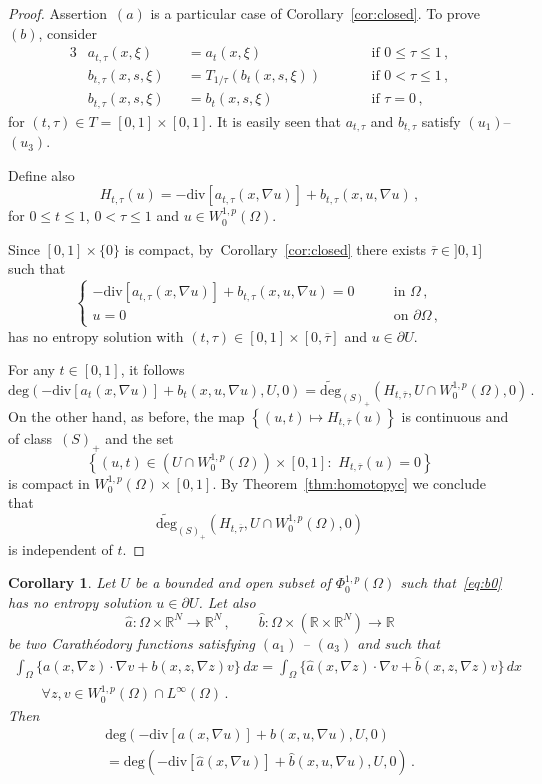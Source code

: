 \documentclass[twoside,reqno]{amsart}
\numberwithin{equation}{section}
\newtheorem{cor}[thm]{Corollary}
\theoremstyle{definition}
\newcommand{\R}{\mathbb{R}}
\begin{document}
%
\begin{proof}
Assertion~$(a)$ is a particular case of
Corollary~\ref{cor:closed}.
To prove~$(b)$, consider
\begin{alignat*}{3}
& a_{t,\tau}(x,\xi) &&= a_t(x,\xi)
&&\qquad\text{if $0\leq \tau\leq 1$}\,,\\
& b_{t,\tau}(x,s,\xi) &&= 
T_{1/\tau}\left(b_t(x,s,\xi)\right)
&&\qquad\text{if $0<\tau\leq 1$}\,,\\
& b_{t,\tau}(x,s,\xi) &&=
b_t(x,s,\xi)
&&\qquad\text{if $\tau=0$}\,,
\end{alignat*}
for $(t,\tau)\in T=[0,1]\times[0,1]$.
It is easily seen that $a_{t,\tau}$ and $b_{t,\tau}$
satisfy $(u_1)$--$(u_3)$.
\par
Define also
\[
H_{t,\tau}(u) =
- \mathrm{div}[a_{t,\tau}(x,\nabla u)] 
+ b_{t,\tau}(x,u,\nabla u)\,,
\]
for $0\leq t\leq 1$, $0<\tau\leq 1$ and $u\in W^{1,p}_0(\Omega)$.
\par
Since $[0,1]\times\{0\}$ is compact, by~Corollary~\ref{cor:closed}
there exists $\overline{\tau}\in]0,1]$ such that 
\[
\begin{cases}
- \mathrm{div}[a_{t,\tau}(x,\nabla u)] 
+ b_{t,\tau}(x,u,\nabla u)=0 
&\qquad\text{in $\Omega$}\,,\\
u=0
&\qquad\text{on $\partial\Omega$}\,,
\end{cases}
\]
has no entropy solution with 
$(t,\tau)\in[0,1]\times[0,\overline{\tau}]$ and $u\in\partial U$.
\par
For any $t\in [0,1]$, it follows
\[
\mathrm{deg}(- \mathrm{div}[a_t(x,\nabla u)] 
+ b_t(x,u,\nabla u),U,0) =
\widetilde{\mathrm{deg}}_{(S)_+}(H_{t,\overline{\tau}},
U\cap W^{1,p}_0(\Omega),0)\,.
\]
On the other hand, as before, the map 
$\left\{(u,t)\mapsto H_{t,\overline{\tau}}(u)\right\}$
is continuous and of class~$(S)_+$ and the set
\[
\left\{(u,t)\in (U\cap W^{1,p}_0(\Omega))\times
[0,1]:\,\,H_{t,\overline{\tau}}(u)=0\right\}
\]
is compact in $W^{1,p}_0(\Omega)\times[0,1]$.
By Theorem~\ref{thm:homotopyc}
we conclude that 
\[
\widetilde{\mathrm{deg}}_{(S)_+}(H_{t,\overline{\tau}},
U\cap W^{1,p}_0(\Omega),0)
\]
is independent of $t$.
\end{proof}
%
\begin{cor}
\label{cor:dec}
Let $U$ be a bounded and open subset of $\Phi^{1,p}_0(\Omega)$
such that~\eqref{eq:b0} has no entropy solution  
$u\in\partial U$.
Let also
\[
\hat{a}:\Omega\times\R^N\rightarrow\R^N\,,\qquad
\hat{b}:\Omega\times(\R\times\R^N)\rightarrow\R
\]
be two Carath\'eodory functions satisfying $(a_1)$ -- $(a_3)$
and such that
\begin{multline*}
\int_{\Omega} \{a(x,\nabla z)\cdot\nabla v + b(x,z,\nabla z)v\}\,dx
= \int_{\Omega} \{\hat{a}(x,\nabla z)\cdot\nabla v 
+ \hat{b}(x,z,\nabla z)v\}\,dx \\
\qquad \forall z, v\in W^{1,p}_0(\Omega)\cap L^{\infty}(\Omega)\,.
\end{multline*}
\indent
Then 
\begin{multline*}
\mathrm{deg}(- \mathrm{div}[a(x,\nabla u)] 
+ b(x,u,\nabla u),U,0) \\
= 
\mathrm{deg}(- \mathrm{div}[\hat{a}(x,\nabla u)] 
+ \hat{b}(x,u,\nabla u),U,0)\,.
\end{multline*}
\end{cor}
\end{document}
